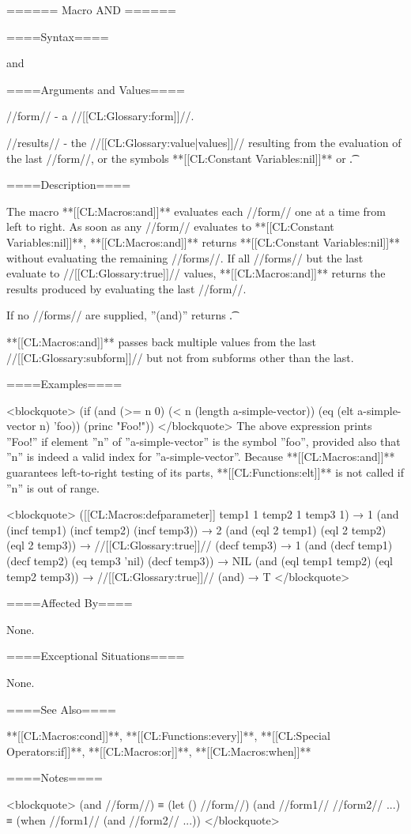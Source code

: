 ====== Macro AND ======

====Syntax====

\DefmacWithValues and {} {}

====Arguments and Values====

//form// - a //[[CL:Glossary:form]]//.

//results// - the //[[CL:Glossary:value|values]]// resulting from the evaluation of the last //form//, or the symbols **[[CL:Constant Variables:nil]]** or \t.

====Description====

The macro **[[CL:Macros:and]]** evaluates each //form// one at a time from left to right. As soon as any //form// evaluates to **[[CL:Constant Variables:nil]]**, **[[CL:Macros:and]]** returns **[[CL:Constant Variables:nil]]** without evaluating the remaining //forms//. If all //forms// but the last evaluate to //[[CL:Glossary:true]]// values, **[[CL:Macros:and]]** returns the results produced by evaluating the last //form//.

If no //forms// are supplied, ''(and)'' returns \t.

**[[CL:Macros:and]]** passes back multiple values from the last //[[CL:Glossary:subform]]// but not from subforms other than the last.

====Examples====

<blockquote> (if (and (>= n 0) (< n (length a-simple-vector)) (eq (elt a-simple-vector n) 'foo)) (princ "Foo!")) </blockquote> The above expression prints ''Foo!'' if element ''n'' of ''a-simple-vector'' is the symbol ''foo'', provided also that ''n'' is indeed a valid index for ''a-simple-vector''. Because **[[CL:Macros:and]]** guarantees left-to-right testing of its parts, **[[CL:Functions:elt]]** is not called if ''n'' is out of range.

<blockquote> ([[CL:Macros:defparameter]] temp1 1 temp2 1 temp3 1) → 1 (and (incf temp1) (incf temp2) (incf temp3)) → 2 (and (eql 2 temp1) (eql 2 temp2) (eql 2 temp3)) → //[[CL:Glossary:true]]// (decf temp3) → 1 (and (decf temp1) (decf temp2) (eq temp3 'nil) (decf temp3)) → NIL (and (eql temp1 temp2) (eql temp2 temp3)) → //[[CL:Glossary:true]]// (and) → T </blockquote>

====Affected By====

None.

====Exceptional Situations====

None.

====See Also====

**[[CL:Macros:cond]]**, **[[CL:Functions:every]]**, **[[CL:Special Operators:if]]**, **[[CL:Macros:or]]**, **[[CL:Macros:when]]**

====Notes====

<blockquote> (and //form//) ≡ (let () //form//) (and //form1// //form2// ...) ≡ (when //form1// (and //form2// ...)) </blockquote>

